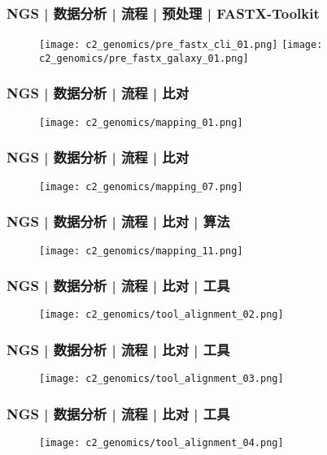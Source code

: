 \begin{frame}
  \frametitle{NGS | 数据分析 | 流程 | 预处理 | FASTX-Toolkit}
  \begin{figure}
    \centering
    \texttt{[image: c2\_genomics/pre\_fastx\_cli\_01.png]}
    \texttt{[image: c2\_genomics/pre\_fastx\_galaxy\_01.png]}
  \end{figure}
\end{frame}

\begin{frame}
  \frametitle{NGS | 数据分析 | 流程 | 比对}
  \begin{figure}
    \centering
    \texttt{[image: c2\_genomics/mapping\_01.png]}
  \end{figure}
\end{frame}

\begin{frame}
  \frametitle{NGS | 数据分析 | 流程 | 比对}
  \begin{figure}
    \centering
    \texttt{[image: c2\_genomics/mapping\_07.png]}
  \end{figure}
\end{frame}

\begin{frame}
  \frametitle{NGS | 数据分析 | 流程 | 比对 | 算法}
  \begin{figure}
    \centering
    \texttt{[image: c2\_genomics/mapping\_11.png]}
  \end{figure}
\end{frame}

\begin{frame}
  \frametitle{NGS | 数据分析 | 流程 | 比对 | 工具}
  \begin{figure}
    \centering
    \texttt{[image: c2\_genomics/tool\_alignment\_02.png]}
  \end{figure}
\end{frame}

\begin{frame}
  \frametitle{NGS | 数据分析 | 流程 | 比对 | 工具}
  \begin{figure}
    \centering
    \texttt{[image: c2\_genomics/tool\_alignment\_03.png]}
  \end{figure}
\end{frame}

\begin{frame}
  \frametitle{NGS | 数据分析 | 流程 | 比对 | 工具}
  \begin{figure}
    \centering
    \texttt{[image: c2\_genomics/tool\_alignment\_04.png]}
  \end{figure}
\end{frame}

